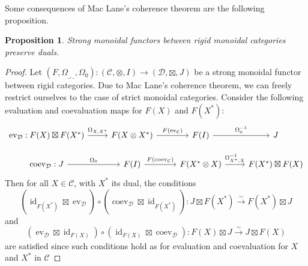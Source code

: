 \documentclass{article}
\theoremstyle{plain}
\newtheorem{proposition}[theorem]{Proposition}
\theoremstyle{definition}
\DeclareMathOperator{\ev}{ev}
\DeclareMathOperator{\coev}{coev}
\DeclareMathOperator{\id}{id}
\begin{document}
\noindent Some consequences of Mac Lane's coherence theorem are the following proposition.

\begin{proposition}
    Strong monoidal functors between rigid monoidal categories preserve duals.    
\end{proposition}
\begin{proof}
    Let $(F,\Omega_{\_,\_},\Omega_0) : (\mathcal{C},\otimes, I) \rightarrow (\mathcal{D},\boxtimes, J)$ be a strong monoidal functor between rigid categories.
    Due to Mac Lane's coherence theorem, we can freely restrict ourselves to the case of strict monoidal categories.
    Consider the following evaluation and coevaluation maps for $F(X)$ and $F(X^*)$:
    \[
    \begin{tikzcd}
        \ev_{\mathcal{D}} : F(X)\boxtimes F(X^*)
        \arrow[r,"\Omega_{X,X^*}"] &
        F(X\otimes X^*) 
        \arrow[r,"F(\ev_{\mathcal{C}})"] &
        F(I)
        \arrow[r,"\Omega_0^{-1}"]&
        J\\
        \coev_{\mathcal{D}} : J 
        \arrow[r,"\Omega_0"]&
        F(I)
        \arrow[r,"F(\coev_{\mathcal{C}})"]&
        F(X^*\otimes X) 
        \arrow[r,"\Omega_{X^*,X}^{-1}"]&
        F(X^*)\boxtimes F(X)
    \end{tikzcd}
    \]
    Then for all $X\in \mathcal{C}$, with $X^*$ its dual, the conditions $$ (\id_{F(X^*)}\boxtimes \ev_{\mathcal{D}}) \circ (\coev_{\mathcal{D}} \boxtimes \id_{F(X^*)}) : J\boxtimes F(X^*) \xrightarrow[]{\sim} F(X^*)\boxtimes J$$ and 
    $$(\ev_{\mathcal{D}} \boxtimes\id_{F(X)})\circ (\id_{F(X)}\boxtimes \coev_{\mathcal{D}}) : F(X)\boxtimes J \xrightarrow[]{\sim} J\boxtimes F(X)$$
    are satisfied since such conditions hold as for evaluation and coevaluation for $X$ and $X^*$ in $\mathcal{C}$
\end{proof}
\end{document}
